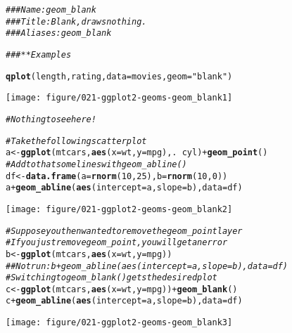 \documentclass[a4paper,titlepage]{tufte-handout}\usepackage[]{graphicx}\usepackage[]{color}
\makeatletter
\def\maxwidth{ %
  \ifdim\Gin@nat@width>\linewidth
    \linewidth
  \else
    \Gin@nat@width
  \fi
}
\newcommand{\hlnum}[1]{\textcolor[rgb]{0.686,0.059,0.569}{#1}}%
\newcommand{\hlstr}[1]{\textcolor[rgb]{0.192,0.494,0.8}{#1}}%
\newcommand{\hlcom}[1]{\textcolor[rgb]{0.678,0.584,0.686}{\textit{#1}}}%
\newcommand{\hlopt}[1]{\textcolor[rgb]{0,0,0}{#1}}%
\newcommand{\hlstd}[1]{\textcolor[rgb]{0.345,0.345,0.345}{#1}}%
\newcommand{\hlkwb}[1]{\textcolor[rgb]{0.69,0.353,0.396}{#1}}%
\newcommand{\hlkwc}[1]{\textcolor[rgb]{0.333,0.667,0.333}{#1}}%
\newcommand{\hlkwd}[1]{\textcolor[rgb]{0.737,0.353,0.396}{\textbf{#1}}}%
\newenvironment{kframe}{%
 \def\at@end@of@kframe{}%
 \ifinner\ifhmode%
  \def\at@end@of@kframe{\end{minipage}}%
  \begin{minipage}{\columnwidth}%
 \fi\fi%
 \def\FrameCommand##1{\hskip\@totalleftmargin \hskip-\fboxsep
 \colorbox{shadecolor}{##1}\hskip-\fboxsep
     \hskip-\linewidth \hskip-\@totalleftmargin \hskip\columnwidth}%
 \MakeFramed {\advance\hsize-\width
   \@totalleftmargin\z@ \linewidth\hsize
   \@setminipage}}%
 {\par\unskip\endMakeFramed%
 \at@end@of@kframe}
\newenvironment{knitrout}{}{} %
\makeatother
\begin{document}
\begin{knitrout}
\color{fgcolor}\begin{kframe}
\begin{alltt}
\hlcom{### Name: geom_blank}
\hlcom{### Title: Blank, draws nothing.}
\hlcom{### Aliases: geom_blank}

\hlcom{### ** Examples}

\hlkwd{qplot}\hlstd{(length, rating,} \hlkwc{data} \hlstd{= movies,} \hlkwc{geom} \hlstd{=} \hlstr{"blank"}\hlstd{)}
\end{alltt}
\end{kframe}
\texttt{[image: figure/021-ggplot2-geoms-geom\_blank1]} 
\begin{kframe}\begin{alltt}
\hlcom{# Nothing to see here!}

\hlcom{# Take the following scatter plot}
\hlstd{a} \hlkwb{<-} \hlkwd{ggplot}\hlstd{(mtcars,} \hlkwd{aes}\hlstd{(}\hlkwc{x} \hlstd{= wt,} \hlkwc{y} \hlstd{= mpg), .} \hlopt{~} \hlstd{cyl)} \hlopt{+} \hlkwd{geom_point}\hlstd{()}
\hlcom{# Add to that some lines with geom_abline()}
\hlstd{df} \hlkwb{<-} \hlkwd{data.frame}\hlstd{(}\hlkwc{a} \hlstd{=} \hlkwd{rnorm}\hlstd{(}\hlnum{10}\hlstd{,} \hlnum{25}\hlstd{),} \hlkwc{b} \hlstd{=} \hlkwd{rnorm}\hlstd{(}\hlnum{10}\hlstd{,} \hlnum{0}\hlstd{))}
\hlstd{a} \hlopt{+} \hlkwd{geom_abline}\hlstd{(}\hlkwd{aes}\hlstd{(}\hlkwc{intercept} \hlstd{= a,} \hlkwc{slope} \hlstd{= b),} \hlkwc{data} \hlstd{= df)}
\end{alltt}
\end{kframe}
\texttt{[image: figure/021-ggplot2-geoms-geom\_blank2]} 
\begin{kframe}\begin{alltt}
\hlcom{# Suppose you then wanted to remove the geom_point layer}
\hlcom{# If you just remove geom_point, you will get an error}
\hlstd{b} \hlkwb{<-} \hlkwd{ggplot}\hlstd{(mtcars,} \hlkwd{aes}\hlstd{(}\hlkwc{x} \hlstd{= wt,} \hlkwc{y} \hlstd{= mpg))}
\hlcom{## Not run: b + geom_abline(aes(intercept = a, slope = b), data = df)}
\hlcom{# Switching to geom_blank() gets the desired plot}
\hlstd{c} \hlkwb{<-} \hlkwd{ggplot}\hlstd{(mtcars,} \hlkwd{aes}\hlstd{(}\hlkwc{x} \hlstd{= wt,} \hlkwc{y} \hlstd{= mpg))} \hlopt{+} \hlkwd{geom_blank}\hlstd{()}
\hlstd{c} \hlopt{+} \hlkwd{geom_abline}\hlstd{(}\hlkwd{aes}\hlstd{(}\hlkwc{intercept} \hlstd{= a,} \hlkwc{slope} \hlstd{= b),} \hlkwc{data} \hlstd{= df)}
\end{alltt}
\end{kframe}
\texttt{[image: figure/021-ggplot2-geoms-geom\_blank3]} 

\end{knitrout}
\end{document}
